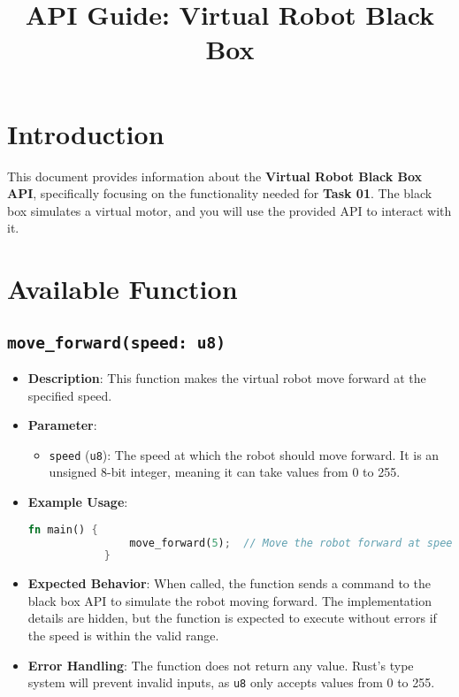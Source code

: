 \documentclass{article}
\title{API Guide: Virtual Robot Black Box}
\author{}
\date{}
\begin{document}
	
	\maketitle
	
	\section*{Introduction}
	This document provides information about the \textbf{Virtual Robot Black Box API}, specifically focusing on the functionality needed for \textbf{Task 01}. The black box simulates a virtual motor, and you will use the provided API to interact with it.
	
	\section*{Available Function}
	
	\subsection*{\texttt{move\_forward(speed: u8)}}
	\begin{itemize}
		\item \textbf{Description}: 
		This function makes the virtual robot move forward at the specified speed.
		\item \textbf{Parameter}: 
		\begin{itemize}
			\item \texttt{speed} (\texttt{u8}): 
			The speed at which the robot should move forward. It is an unsigned 8-bit integer, meaning it can take values from 0 to 255.
		\end{itemize}
		\item \textbf{Example Usage}:
		\begin{lstlisting}[language=Rust, caption={Using the move\_forward function}]
			fn main() {
				move_forward(5);  // Move the robot forward at speed 5
			}
		\end{lstlisting}
		\item \textbf{Expected Behavior}:
		When called, the function sends a command to the black box API to simulate the robot moving forward. The implementation details are hidden, but the function is expected to execute without errors if the speed is within the valid range.
		\item \textbf{Error Handling}:
		The function does not return any value. Rust's type system will prevent invalid inputs, as \texttt{u8} only accepts values from 0 to 255.
	\end{itemize}
	
\end{document}
